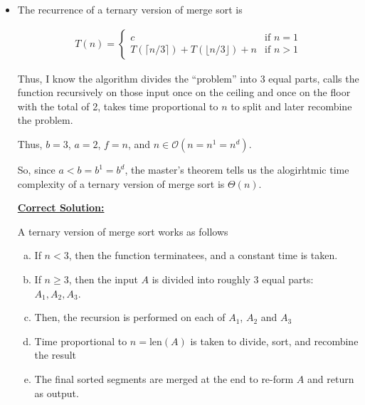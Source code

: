 \documentclass[12pt]{article}
\begin{document}
\begin{itemize}
    \item
    \setcounter{equation}{0}
    \bigskip

    The recurrence of a ternary version of merge sort is

    \begin{align}
        T(n) = \begin{cases}
        c    & \text{if $n = 1$}\\
        T(\lceil n/3 \rceil) + T(\lfloor n/3 \rfloor) + n & \text{if $n > 1$}
        \end{cases}
    \end{align}

    \bigskip

    Thus, I know the algorithm divides the ``problem'' into 3 equal parts, calls
    the function recursively on those input once on the ceiling and once on the floor with
    the total of 2, takes time proportional to $n$ to split and later recombine
    the problem.

    \bigskip

    Thus, $b = 3$, $a = 2$, $f = n$, and $n \in \mathcal{O}(n = n^1 = n^d)$.

    \bigskip

    So, since $a < b = b^1 = b^d$, the master's theorem tells us the alogirhtmic
    time complexity of a ternary version of merge sort is $\Theta(n)$.

    \bigskip

    \begin{mdframed}
        \underline{\textbf{Correct Solution:}}

        \bigskip

        \setcounter{equation}{0}
        \bigskip
        \color{red}
        A ternary version of merge sort works as follows

        \begin{enumerate}[a.]
            \item If $n < 3$, then the function terminatees, and a constant time is taken.
            \item If $n \geq 3$, then the input $A$ is divided into roughly
            3 equal parts: $A_1,A_2,A_3$.
            \item Then, the recursion is performed on each of $A_1$, $A_2$ and $A_3$
            \item Time proportional to $n = \text{len}(A)$ is taken to divide, sort, and
            recombine the result
            \item The final sorted segments are merged at the end to re-form $A$
            and return as output.
        \end{enumerate}
        \color{black}


\end{mdframed}
\end{itemize}
\end{document}
